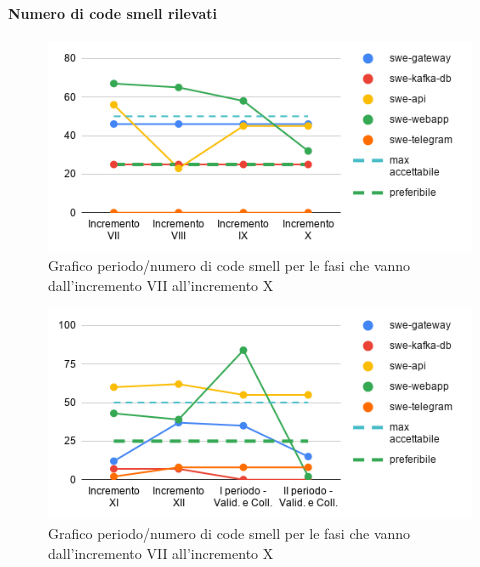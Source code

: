 \paragraph{Numero di code smell rilevati}
	\begin{figure}[H]
			\centering
			\includegraphics[width=0.8\linewidth]{./res/images/QM-PROD-13-NCS.png}
			\caption{Grafico periodo/numero di code smell per le fasi che vanno dall'incremento VII all'incremento X}
			\label{fig:Grafico periodo/rischio per le fasi che vanno dall'incremento VII all'incremento X}
	\end{figure}
		\begin{figure}[H]
			\centering
			\includegraphics[width=0.8\linewidth]{./res/images/QM-PROD-13-NCS_1.png}
			\caption{Grafico periodo/numero di code smell per le fasi che vanno dall'incremento VII all'incremento X}
			\label{fig:Grafico periodo/rischio per le fasi che vanno dall'incremento XI alla fase di validazione e collaudo}
	\end{figure}

